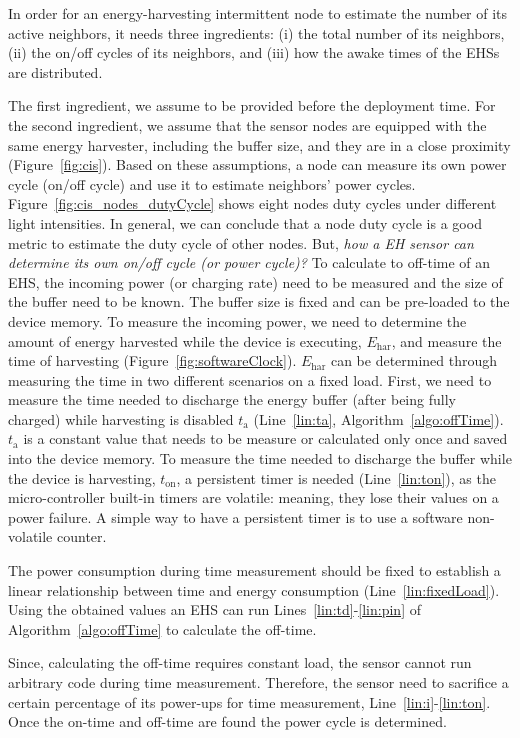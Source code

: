 \documentclass{article}
\begin{document}
In order for an energy-harvesting intermittent node to estimate the number of its active neighbors, it needs three ingredients: (i) the total number of its neighbors, (ii) the on/off cycles of its neighbors, and (iii) how the awake times of the EHSs are distributed. 

The first ingredient, we assume to be provided before the deployment time. For the second ingredient, we assume that the sensor nodes are equipped with the same energy harvester, including the buffer size, and they are in a close proximity (Figure~\ref{fig:cis}). Based on these assumptions, a node can measure its own power cycle (on/off cycle) and use it to estimate neighbors' power cycles. Figure~\ref{fig:cis_nodes_dutyCycle} shows eight nodes duty cycles under different light intensities. In general, we can conclude that a node duty cycle is a good metric to estimate the duty cycle of other nodes. But, \emph{how a EH sensor can determine its own on/off cycle (or power cycle)?}
To calculate to off-time of an EHS, the incoming power (or charging rate) need to be measured and the size of the buffer need to be known. The buffer size is fixed and can be pre-loaded to the device memory.
To measure the incoming power, we need to determine the amount of energy harvested while the device is executing, $E_\text{har}$, and measure the time of harvesting (Figure~\ref{fig:softwareClock}).
$E_\text{har}$ can be determined through measuring the time in two different scenarios on a fixed load. 
First, we need to  measure the time needed to discharge the energy buffer (after being fully charged) while harvesting is disabled $t_\text{a}$ (Line~\ref{lin:ta}, Algorithm~\ref{algo:offTime}). $t_\text{a}$ is a constant value that needs to be measure or calculated only once and saved into the device memory. 
To measure the time needed to discharge the buffer while the device is harvesting, $t_\text{on}$, a persistent timer is needed (Line~\ref{lin:ton}), as the micro-controller built-in timers are volatile: meaning, they lose their values on a power failure. A simple way to have a persistent timer is to use a software non-volatile counter. 

The power consumption during time measurement should be fixed to establish a linear relationship between time and energy consumption (Line~\ref{lin:fixedLoad}).  
Using the obtained values an EHS can run Lines~\ref{lin:td}-\ref{lin:pin} of Algorithm~\ref{algo:offTime} to calculate the off-time. 

Since, calculating the off-time requires constant load, the sensor cannot run arbitrary code during time measurement. Therefore, the sensor need to sacrifice a certain percentage of its power-ups for time measurement, Line~\ref{lin:i}-\ref{lin:ton}. Once the on-time and off-time are found the power cycle is determined. 
\end{document}
